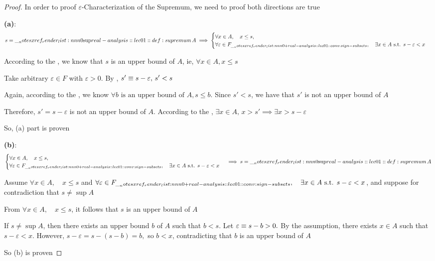\documentclass[12pt]{article}
\begin{document}
\begin{proof}
In order to proof \(\varepsilon\)-Characterization of the Supremum, we need to proof both directions are true

\textbf{(a)}: 
  \[
    s=\sup A
    \implies
    \begin{cases}
      \forall x\in A,\quad x\leq s,\\
      \forall\varepsilon\in\apos{F},\quad
      \exists x\in A\text{ s.t. }s-\varepsilon<x
    \end{cases}
  \] 

  According to the , we know that $s$ is an upper bound of \(A\), ie, $\forall x\in A, x \leq s$

  Take arbitrary \(\varepsilon\in F\) with \(\varepsilon>0\). By ,
  \(
  s' \equiv s-\varepsilon, \, s'<s
  \)

  Again, according to the , we know $\forall b \text{ is an upper bound of } A, s \leq b$.
  Since $s' < s$, we have that $s'$ is not an upper bound of $A$

  Therefore, $s' = s - \varepsilon$ is not an upper bound of $A$. According to the , $\exists x\in A, \, x > s' \implies \exists x > s - \varepsilon$

  So, (a) part is proven

\textbf{(b)}: 
  \[
    \begin{cases}
      \forall x\in A,\quad x\leq s,\\
      \forall\varepsilon\in\apos{F},\quad
      \exists x\in A\text{ s.t. }s-\varepsilon<x
    \end{cases}
    \implies
    s=\sup A
  \] 

  Assume $\forall x\in A,\quad x\leq s$ and \(\forall\varepsilon\in\apos{F},\quad \exists x\in A\text{ s.t. }s-\varepsilon<x\), and suppose for contradiction that $s \neq \sup A$

  From $\forall x\in A,\quad x\leq s$, it follows that $s$ is an upper bound of \(A\)

  If $s \neq \sup A$, then there exists an upper bound $b$ of \(A\) such that $b < s$. Let
  \(
    \varepsilon \equiv s-b > 0.
  \)
  By the assumption, there exists $x\in A$ such that
  \(
    s-\varepsilon<x.
  \)
  However,
  \(
    s-\varepsilon=s-(s-b)=b,
  \) 
  so $b<x$, contradicting that $b$ is an upper bound of $A$

  So (b) is proven
\end{proof}
\end{document}
